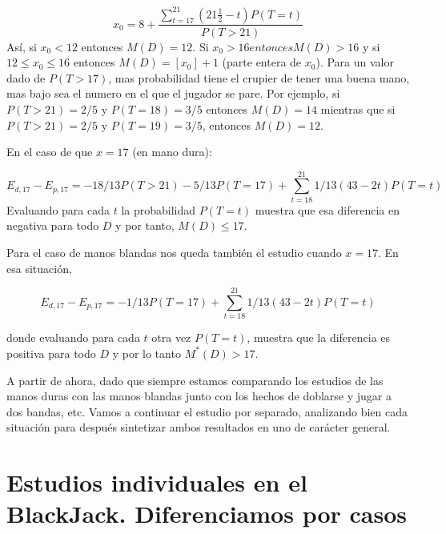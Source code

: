 \documentclass[12pt,a4paper,]{book}
\def\ifdoblecara{} %
\def\ifprincipal{} %
\numberwithin{dummy}{section}
\theoremstyle{ocrenumbox}
\theoremstyle{blacknumex}
\theoremstyle{blacknumbox}
\theoremstyle{ocrenum}
\theoremstyle{ocrenum}
\begin{document}
\[
x_0 = 8+ \frac{\sum_{t=17}^{21}(21 \frac{1}{2}-t)P(T=t)}{P(T>21)}
\] Así, si \(x_0 < 12\) entonces \(M(D)=12\). Si
\(x_0>16 entonces M(D)>16\) y si \(12 \leq x_0 \leq 16\) entonces
\(M(D) = [x_0]+1\) (parte entera de \(x_0\)). Para un valor dado de
\(P(T>17)\), mas probabilidad tiene el crupier de tener una buena mano,
mas bajo sea el numero en el que el jugador se pare. Por ejemplo, si
\(P(T>21)=2/5\) y \(P(T=18)=3/5\) entonces \(M(D)=14\) mientras que si
\(P(T>21)=2/5\) y \(P(T=19)=3/5\), entonces \(M(D)=12\).

En el caso de que \(x=17\) (en mano dura):

\[
E_{d,17}-E_{p,17} = -18/13P(T>21)- 5/13P(T=17)+ \sum_{t=18}^{21}1/13(43-2t)P(T=t)
\] Evaluando para cada \(t\) la probabilidad \(P(T=t)\) muestra que esa
diferencia en negativa para todo \(D\) y por tanto, \(M(D) \leq 17\).

Para el caso de manos blandas nos queda también el estudio cuando
\(x=17\). En esa situación,

\[
E_{d,17}-E_{p,17} = -1/13P(T=17)+ \sum_{t=18}^{21}1/13(43-2t)P(T=t)
\]

donde evaluando para cada \(t\) otra vez \(P(T=t)\), muestra que la
diferencia es positiva para todo \(D\) y por lo tanto \(M^*(D)>17\).

A partir de ahora, dado que siempre estamos comparando los estudios de
las manos duras con las manos blandas junto con los hechos de doblarse y
jugar a dos bandas, etc. Vamos a continuar el estudio por separado,
analizando bien cada situación para después sintetizar ambos resultados
en uno de carácter general.

\FloatBarrier

\ifdefined\ifprincipal
\else
\setlength{\parindent}{1em}
\pagestyle{fancy}
\setcounter{tocdepth}{4}
\tableofcontents

\fi

\ifdefined\ifdoblecara
\fancyhead{}{}
\fancyhead[LE,RO]{\scriptsize\rightmark}
\fancyfoot[LO,RE]{\scriptsize\slshape \leftmark}
\fancyfoot[C]{}
\fancyfoot[LE,RO]{\footnotesize\thepage}
\else
\fancyhead{}{}
\fancyhead[RO]{\scriptsize\rightmark}
\fancyfoot[LO]{\scriptsize\slshape \leftmark}
\fancyfoot[C]{}
\fancyfoot[RO]{\footnotesize\thepage}
\fi

\renewcommand{\headrulewidth}{0.4pt}
\renewcommand{\footrulewidth}{0.4pt}

\hypertarget{Seccion4}{%
\chapter{Estudios individuales en el BlackJack. Diferenciamos por
casos}\label{Seccion4}}
\end{document}
